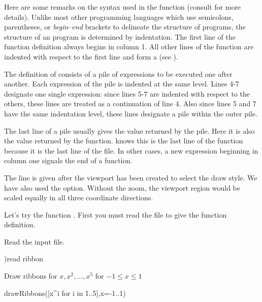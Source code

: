 Here are some remarks on the syntax used in the  function
(consult  for more details).
Unlike most other programming languages which use semicolons,
parentheses, or {\it begin}--{\it end} brackets to delineate the
structure of programs, the structure of an \Language{} program is
determined by indentation.
The first line of the function definition always begins in column 1.
All other lines of the function are indented with respect to the first
line and form a  (see ).

The definition of 
consists of a pile of expressions to be executed one after
another.
Each expression of the pile is indented at the same level.
Lines 4-7 designate one single expression:
since lines 5-7 are indented with respect to the others, these
lines are treated as a continuation of line 4.
Also since lines 5 and 7 have the same indentation level, these
lines designate a pile within the outer pile.

The last line of a pile usually gives the value returned by the
pile.
Here it is also the value returned by the function.
\Language{} knows this is the last line of the function because it
is the last line of the file.
In other cases, a new expression beginning in column one signals
the end of a function.

The line  is given after the viewport
has been created to select the draw style.
We have also used the 
option.
Without the zoom, the viewport region would be scaled equally in
all three coordinate directions.

Let's try the function .
First you must read the file to give \Language{} the function definition.

\begin{xtc}
\begin{xtccomment}
Read the input file.
\end{xtccomment}
\begin{spadsrc}
)read ribbon 
\end{spadsrc}
\end{xtc}
\begin{psXtc}
\begin{xtccomment}
Draw ribbons for $x, x^2,\dots, x^5$
for $-1 \leq x \leq 1$
\end{xtccomment}
\begin{spadsrc}
drawRibbons([x^i for i in 1..5],x=-1..1) 
\end{spadsrc}
\end{psXtc}


